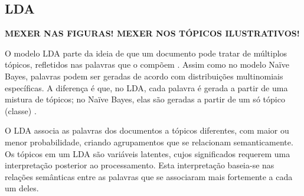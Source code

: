 









\subsection{LDA}
\label{subsection:LDA}

\textbf{MEXER NAS FIGURAS! MEXER NOS TÓPICOS ILUSTRATIVOS!}

O modelo LDA parte da ideia de que um documento pode tratar de múltiplos tópicos, refletidos nas palavras que o compõem \cite{pnas}. Assim como no modelo Naïve Bayes, palavras podem ser geradas de acordo com distribuições multinomiais específicas. A diferença é que, no LDA, cada palavra é gerada a partir de uma mistura de tópicos; no Naïve Bayes, elas são geradas a partir de um só tópico (classe) \cite{gibbs-lingpipe}.

O LDA associa as palavras dos documentos a tópicos diferentes, com maior ou menor probabilidade, criando agrupamentos que se relacionam semanticamente. Os tópicos em um LDA são variáveis latentes, cujos significados requerem uma interpretação posterior ao processamento. Esta interpretação baseia-se nas relações semânticas entre as palavras que se associaram mais fortemente a cada um deles. %

